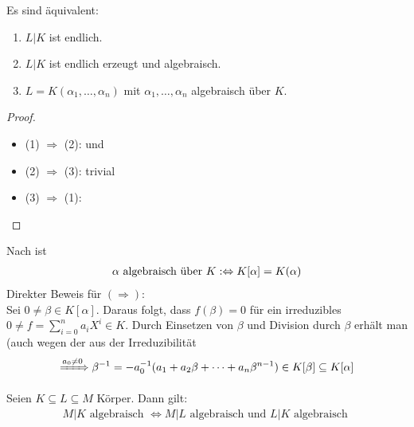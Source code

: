 
\begin{conclusion}
	Es sind äquivalent:
	\begin{enumerate}
		\item $L \vert K$ ist endlich.
		\item $L \vert K$ ist endlich erzeugt und algebraisch.
		\item $L = K(\alpha_1, \dots , \alpha_n)$ mit $\alpha_1, \dots, \alpha_n$ algebraisch über $K$.
	\end{enumerate}
\end{conclusion}

\begin{proof}
	\begin{itemize}
		\item (1) $\Rightarrow$ (2):  und 
		\item (2) $\Rightarrow$ (3): trivial
		\item (3) $\Rightarrow$ (1): 
	\end{itemize}
\end{proof}

\begin{remark}
	Nach  ist
	\begin{align}
	\alpha \text{ algebraisch über } K :\Leftrightarrow K[\alpha] = K(\alpha) \notag
	\end{align}
	Direkter Beweis für $(\Rightarrow)$: \\
	Sei $0 \neq \beta \in K[\alpha]$. Daraus folgt, dass $f(\beta) = 0$ für ein irreduzibles $0 \neq f = \sum_{i=0}^n a_i X^i \in K$. Durch Einsetzen von $\beta$ und Division durch $\beta$ erhält man (auch wegen der aus der Irreduzibilität
	\begin{align}
	\xRightarrow{a_0 \neq 0}\beta^{-1} = -a_0^{-1} ( a_1 + a_2 \beta + \dots + a_n \beta^{n-1}) \in K[\beta] \subseteq K[\alpha] \notag
	\end{align}
\end{remark}
\begin{proposition}
	Seien $K \subseteq L \subseteq M$ Körper. Dann gilt:
	\begin{align*}
		M\vert K \text{ algebraisch } \Leftrightarrow M\vert L \text{ algebraisch und } L \vert K \text{ algebraisch }
	\end{align*}
\end{proposition}

